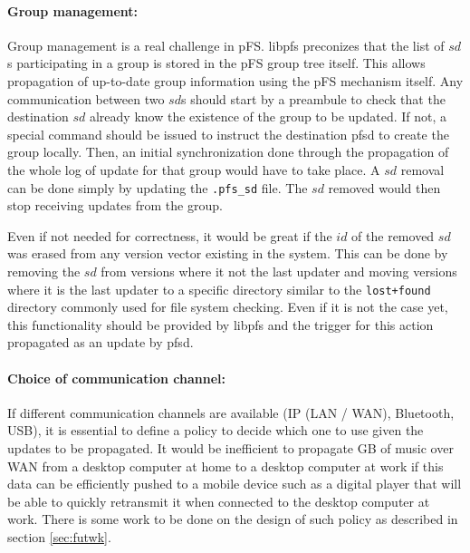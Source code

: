 \paragraph {Group management:}
Group management is a real challenge in pFS. libpfs preconizes that
the list of $sd$s participating in a group is stored in the pFS group
tree itself. This allows propagation of up-to-date group information
using the pFS mechanism itself. Any communication between two $sd$s
should start by a preambule to check that the destination $sd$ already
know the existence of the group to be updated. If not, a special
command should be issued to instruct the destination pfsd to create the group
locally. Then, an initial synchronization done through the propagation
of the whole log of update for that group would  have to take place. A $sd$
removal can be done simply by updating the {\tt .pfs\_sd} file. The $sd$
removed would then stop receiving updates from the group.

Even if not needed for correctness, it would be great if the $id$ of
the removed $sd$ was erased from any version vector existing in the
system. This can be done by removing the $sd$ from versions where it
not the last updater and moving versions where it is the last updater
to a specific directory similar to the {\tt lost+found} directory
commonly used for file system checking. Even if it is not the case
yet, this functionality should be provided by libpfs and the trigger
for this action propagated as an update by pfsd.

\paragraph {Choice of communication channel:}
If different communication channels are available (IP (LAN / WAN),
Bluetooth, USB), it is essential to define a policy to decide which
one to use given the updates to be propagated. It would be
inefficient to propagate GB of music over WAN from a desktop computer
at home to a desktop computer at work if this data can be efficiently
pushed to a mobile device such as a digital player that will be able
to quickly retransmit it when connected to the desktop computer at
work. There is some work to be done on the design of such
policy as described in section \ref{sec:futwk}.


